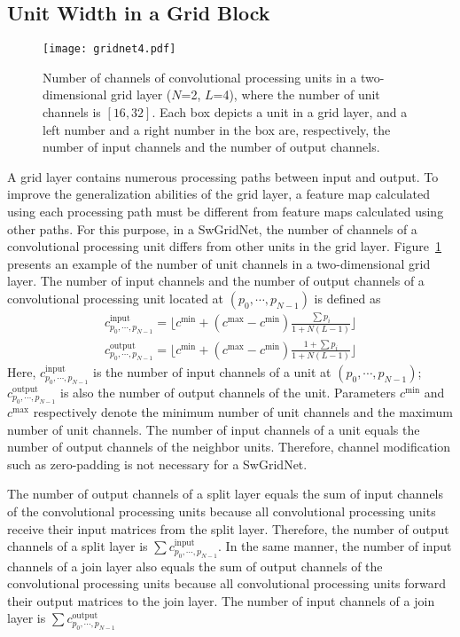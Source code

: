 \documentclass[10pt,twocolumn,letterpaper]{article}
\begin{document}
\subsection{Unit Width in a Grid Block}

\begin{figure}
\centering
 \texttt{[image: gridnet4.pdf]}
 \caption{Number of channels of convolutional processing units in a two-dimensional grid layer ($N$=2, $L$=4), where the number of unit channels is $[16, 32]$.
Each box depicts a unit in a grid layer,
and a left number and a right number in the box are, respectively, the number of input channels and the number of output channels.}
 \label{fig:gridnet4}
\end{figure}

A grid layer contains numerous processing paths between input and output.
To improve the generalization abilities of the grid layer,
a feature map calculated using each processing path must be different from feature maps calculated using other paths.
For this purpose, in a SwGridNet, the number of channels of a convolutional processing unit differs from other units in the grid layer.
Figure~\ref{fig:gridnet4} presents an example of the number of unit channels in a two-dimensional grid layer.
The number of input channels and the number of output channels of a convolutional processing unit located at $(p_0,\cdots,p_{N-1})$ is defined as
\begin{eqnarray}
c^{\textrm{input}}_{p_0,\cdots,p_{N-1}} = \lfloor c^{\textrm{min}} + (c^{\textrm{max}} - c^{\textrm{min}})\frac{\sum p_i}{1+N(L-1)} \rfloor \\
c^{\textrm{output}}_{p_0,\cdots,p_{N-1}} = \lfloor c^{\textrm{min}} + (c^{\textrm{max}} - c^{\textrm{min}})\frac{1+\sum p_i}{1+N(L-1)} \rfloor
\end{eqnarray}
Here, $c^{\textrm{input}}_{p_0,\cdots,p_{N-1}}$ is the number of input channels of a unit at $(p_0,\cdots,p_{N-1})$;
$c^{\textrm{output}}_{p_0,\cdots,p_{N-1}}$ is also the number of output channels of the unit.
Parameters $c^{\textrm{min}}$ and $c^{\textrm{max}}$ respectively denote the minimum number of unit channels and the maximum number of unit channels.
The number of input channels of a unit equals the number of output channels of the neighbor units.
Therefore, channel modification such as zero-padding is not necessary for a SwGridNet.

The number of output channels of a split layer equals the sum of input channels of the convolutional processing units because all convolutional processing units receive their input matrices from the split layer.
Therefore, the number of output channels of a split layer is $\sum c^{\textrm{input}}_{p_0,\cdots,p_{N-1}}$.
In the same manner, the number of input channels of a join layer also equals the sum of output channels of the convolutional processing units because all convolutional processing units forward their output matrices to the join layer.
The number of input channels of a join layer is $\sum c^{\textrm{output}}_{p_0,\cdots,p_{N-1}}$
\end{document}
